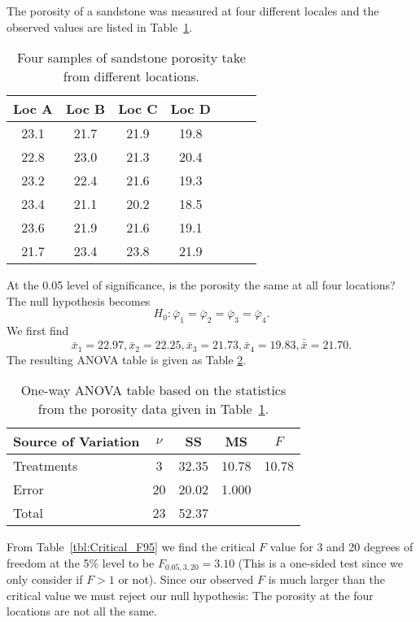 \begin{example}
The porosity of a sandstone was measured at four different 
locales and the observed values are listed in Table~\ref{tbl:sandstone_data}.
\begin{table}[h]
\center
\begin{tabular}{|c|c|c|c|c|c|c|} \hline
\bf{Loc A} &  \bf{Loc B} & \bf{Loc C} & \bf{Loc D} \\ \hline
23.1 & 21.7 & 21.9 & 19.8 \\ \hline
22.8  & 23.0 & 21.3 & 20.4 \\ \hline
23.2  & 22.4 & 21.6 & 19.3 \\ \hline
23.4 & 21.1 & 20.2 & 18.5 \\ \hline
23.6 & 21.9 & 21.6 & 19.1 \\ \hline
21.7 & 23.4 & 23.8 & 21.9 \\ \hline
\end{tabular}
\caption{Four samples of sandstone porosity take from different locations.}
\label{tbl:sandstone_data}
\end{table}
At the 0.05 level of significance, is the porosity the same at all four locations?  The null 
hypothesis becomes
\begin{equation}
H_0: \bar{\varphi} _1 = \bar{\varphi}_2  = \bar{\varphi}_3 = \bar{\varphi}_4.
\end{equation}	 
We first find
\begin{equation}
\bar{x}_1 = 22.97, \bar{x}_2 = 22.25, \bar{x}_3 = 21.73, \bar{x}_4 = 19.83, \bar{\bar{x}} = 21.70.
\end{equation}
The resulting ANOVA table is given as Table \ref{tbl:sandstone_ANOVA}.
\begin{table}[h]
\center
\begin{tabular}{|l|c|c|c|c|} \hline
\bf{Source of Variation} & $\nu$ & \bf{SS} & \bf{MS} & $F$ \\ \hline	
Treatments & 3 & 32.35 & 10.78 & 10.78  \\ \hline
Error & 20 & 20.02 & 1.000 &   \\ \hline
Total & 23 & 52.37 & &  \\ \hline
\end{tabular}
\caption{One-way ANOVA table based on the statistics from the porosity data given in Table~\ref{tbl:sandstone_data}.}
\label{tbl:sandstone_ANOVA}
\end{table}
From Table~\ref{tbl:Critical_F95} we find the critical $F$ value for 3 and 20 degrees of freedom at the 5\% level to 
be $F_{0.05,3,20} = 3.10$ (This is a one-sided test since we only consider if $F > 1$ or not).  Since our 
observed $F$ is much larger than the critical value we must reject our null hypothesis:  The porosity at the four 
locations are not all the same.
\end{example}
